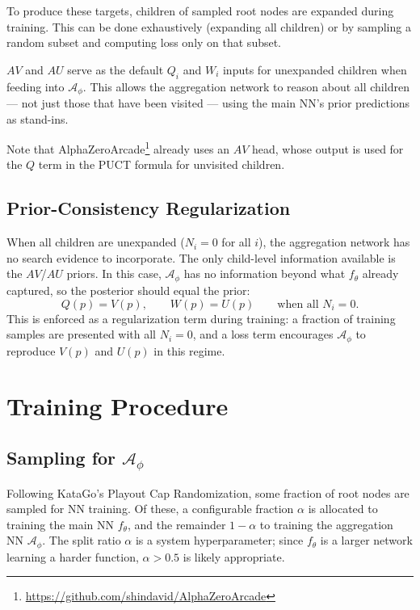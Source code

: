 \documentclass[11pt]{article}
\begin{document}
To produce these targets, children of sampled root nodes are expanded during
training. This can be done exhaustively (expanding all children) or by sampling
a random subset and computing loss only on that subset.

$AV$ and $AU$ serve as the default $Q_i$ and $W_i$ inputs for unexpanded
children when feeding into $\mathcal{A}_\phi$. This allows the aggregation
network to reason about all children --- not just those that have been visited
--- using the main NN's prior predictions as stand-ins.

Note that AlphaZeroArcade\footnote{\url{https://github.com/shindavid/AlphaZeroArcade}}
already uses an $AV$ head, whose output is used for the $Q$ term in the PUCT
formula for unvisited children.

\subsection{Prior-Consistency Regularization}
\label{sec:prior_consistency}

When all children are unexpanded ($N_i = 0$ for all $i$), the aggregation
network has no search evidence to incorporate. The only child-level information
available is the $AV$/$AU$ priors. In this case, $\mathcal{A}_\phi$ has no
information beyond what $f_\theta$ already captured, so the posterior should
equal the prior:
\[
  Q(p) = V(p), \qquad W(p) = U(p) \qquad \text{when all } N_i = 0.
\]
This is enforced as a regularization term during training: a fraction of
training samples are presented with all $N_i = 0$, and a loss term encourages
$\mathcal{A}_\phi$ to reproduce $V(p)$ and $U(p)$ in this regime.

\section{Training Procedure}

\subsection{Sampling for $\mathcal{A}_\phi$}

Following KataGo's Playout Cap Randomization, some fraction of root nodes
are sampled for NN training. Of these, a configurable fraction $\alpha$ is
allocated to training the main NN $f_\theta$, and the remainder $1 - \alpha$
to training the aggregation NN $\mathcal{A}_\phi$. The split ratio $\alpha$
is a system hyperparameter; since $f_\theta$ is a larger network learning a
harder function, $\alpha > 0.5$ is likely appropriate.
\end{document}

